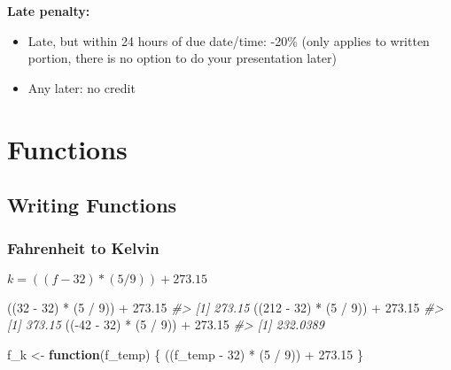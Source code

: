 \documentclass[
]{book}
\newenvironment{Shaded}{\begin{snugshade}}{\end{snugshade}}
\newcommand{\CommentTok}[1]{\textcolor[rgb]{0.56,0.35,0.01}{\textit{#1}}}
\newcommand{\ControlFlowTok}[1]{\textcolor[rgb]{0.13,0.29,0.53}{\textbf{#1}}}
\newcommand{\DecValTok}[1]{\textcolor[rgb]{0.00,0.00,0.81}{#1}}
\newcommand{\FloatTok}[1]{\textcolor[rgb]{0.00,0.00,0.81}{#1}}
\newcommand{\NormalTok}[1]{#1}
\newcommand{\OtherTok}[1]{\textcolor[rgb]{0.56,0.35,0.01}{#1}}
\newcommand{\SpecialCharTok}[1]{\textcolor[rgb]{0.00,0.00,0.00}{#1}}
\providecommand{\tightlist}{%
  \setlength{\itemsep}{0pt}\setlength{\parskip}{0pt}}
\begin{document}
\textbf{Late penalty:}

\begin{itemize}
\tightlist
\item
  Late, but within 24 hours of due date/time: -20\% (only applies to written portion, there is no option to do your presentation later)
\item
  Any later: no credit
\end{itemize}

\hypertarget{functions}{%
\chapter{Functions}\label{functions}}

\hypertarget{writing-functions}{%
\section{Writing Functions}\label{writing-functions}}

\hypertarget{fahrenheit-to-kelvin}{%
\subsection{Fahrenheit to Kelvin}\label{fahrenheit-to-kelvin}}

\(k = ((f - 32) * (5 / 9)) + 273.15\)

\begin{Shaded}
\begin{Highlighting}[]
\NormalTok{((}\DecValTok{32} \SpecialCharTok{{-}} \DecValTok{32}\NormalTok{) }\SpecialCharTok{*}\NormalTok{ (}\DecValTok{5} \SpecialCharTok{/} \DecValTok{9}\NormalTok{)) }\SpecialCharTok{+} \FloatTok{273.15}
\CommentTok{\#\textgreater{} [1] 273.15}
\NormalTok{((}\DecValTok{212} \SpecialCharTok{{-}} \DecValTok{32}\NormalTok{) }\SpecialCharTok{*}\NormalTok{ (}\DecValTok{5} \SpecialCharTok{/} \DecValTok{9}\NormalTok{)) }\SpecialCharTok{+} \FloatTok{273.15}
\CommentTok{\#\textgreater{} [1] 373.15}
\NormalTok{((}\SpecialCharTok{{-}}\DecValTok{42} \SpecialCharTok{{-}} \DecValTok{32}\NormalTok{) }\SpecialCharTok{*}\NormalTok{ (}\DecValTok{5} \SpecialCharTok{/} \DecValTok{9}\NormalTok{)) }\SpecialCharTok{+} \FloatTok{273.15}
\CommentTok{\#\textgreater{} [1] 232.0389}
\end{Highlighting}
\end{Shaded}

\begin{Shaded}
\begin{Highlighting}[]
\NormalTok{f\_k }\OtherTok{\textless{}{-}} \ControlFlowTok{function}\NormalTok{(f\_temp) \{}
\NormalTok{    ((f\_temp }\SpecialCharTok{{-}} \DecValTok{32}\NormalTok{) }\SpecialCharTok{*}\NormalTok{ (}\DecValTok{5} \SpecialCharTok{/} \DecValTok{9}\NormalTok{)) }\SpecialCharTok{+} \FloatTok{273.15}
\NormalTok{\}}
\end{Highlighting}
\end{Shaded}
\end{document}
